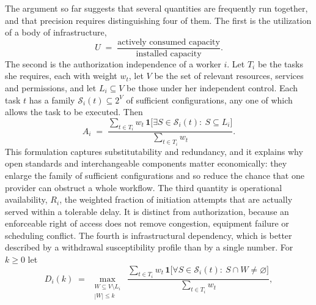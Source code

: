 \documentclass[11pt]{article}
\theoremstyle{plain}
\theoremstyle{definition}
\begin{document}
The argument so far suggests that several quantities are frequently run together, and that precision requires distinguishing four of them. The first is the utilization of a body of infrastructure,
\[
U \;=\; \frac{\text{actively consumed capacity}}{\text{installed capacity}}.
\]
The second is the authorization independence of a worker $i$. Let $T_i$ be the tasks she requires, each with weight $w_t$, let $V$ be the set of relevant resources, services and permissions, and let $L_i\subseteq V$ be those under her independent control. Each task $t$ has a family $\mathcal{S}_i(t)\subseteq 2^{V}$ of sufficient configurations, any one of which allows the task to be executed. Then
\[
A_i \;=\; \frac{\sum_{t\in T_i} w_t\,\mathbf{1}\bigl[\exists S\in\mathcal{S}_i(t):\ S\subseteq L_i\bigr]}{\sum_{t\in T_i} w_t}.
\]
This formulation captures substitutability and redundancy, and it explains why open standards and interchangeable components matter economically: they enlarge the family of sufficient configurations and so reduce the chance that one provider can obstruct a whole workflow. The third quantity is operational availability, $R_i$, the weighted fraction of initiation attempts that are actually served within a tolerable delay. It is distinct from authorization, because an enforceable right of access does not remove congestion, equipment failure or scheduling conflict. The fourth is infrastructural dependency, which is better described by a withdrawal susceptibility profile than by a single number. For $k\ge 0$ let
\[
D_i(k) \;=\; \max_{\substack{W\subseteq V\setminus L_i\\ |W|\le k}}\ \frac{\sum_{t\in T_i} w_t\,\mathbf{1}\bigl[\forall S\in\mathcal{S}_i(t):\ S\cap W\neq\varnothing\bigr]}{\sum_{t\in T_i} w_t},
\]
\end{document}
